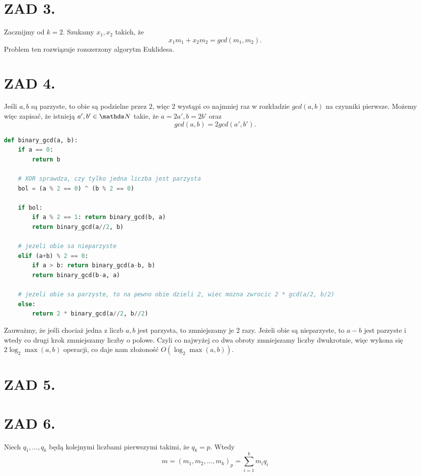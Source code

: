 \documentclass{article}[13pt]
\begin{document}
\section*{ZAD 3.}

Zacznijmy od $k=2$. Szukamy $x_1, x_2$ takich, że
$$x_1m_1+x_2m_2=gcd(m_1,m_2).$$
Problem ten rozwiązuje rozszerzony algorytm Euklidesa.


\section*{ZAD 4.}

Jeśli $a,b$ są parzyste, to obie są podzielne przez $2$, więc $2$ wystąpi co najmniej raz w rozkładzie $gcd(a,b)$ na czynniki pierwsze. Możemy więc zapisać, że istnieją $a',b'\in\N$ takie, że $a=2a',b=2b'$ oraz
$$gcd(a,b)=2gcd(a',b').$$

\begin{lstlisting}[language=Python]
def binary_gcd(a, b):
    if a == 0:
        return b

    # XOR sprawdza, czy tylko jedna liczba jest parzysta
    bol = (a % 2 == 0) ^ (b % 2 == 0)

    if bol:
        if a % 2 == 1: return binary_gcd(b, a)
        return binary_gcd(a//2, b)

    # jezeli obie sa nieparzyste
    elif (a+b) % 2 == 0:
        if a > b: return binary_gcd(a-b, b)
        return binary_gcd(b-a, a)
    
    # jezeli obie sa parzyste, to na pewno obie dzieli 2, wiec mozna zwrocic 2 * gcd(a/2, b/2)
    else:
        return 2 * binary_gcd(a//2, b//2)
\end{lstlisting}

Zauważmy, że jeśli chociaż jedna z liczb $a,b$ jest parzysta, to zmniejszamy je 2 razy. Jeżeli obie są nieparzyste, to $a-b$ jest parzyste i wtedy co drugi krok zmniejszamy liczby o polowe. Czyli co najwyżej co dwa obroty zmniejszamy liczby dwukrotnie, więc wykona się $2\log_2\max(a,b)$ operacji, co daje nam złożoność $O(\log_2\max(a,b))$.


\section*{ZAD 5.}

\section*{ZAD 6.}

Niech $q_1,...,q_k$ będą kolejnymi liczbami pierwszymi takimi, że $q_k=p$. Wtedy
$$m=(m_1,m_2,...,m_k)_p=\sum\limits_{i=1}^km_iq_i$$
\end{document}
